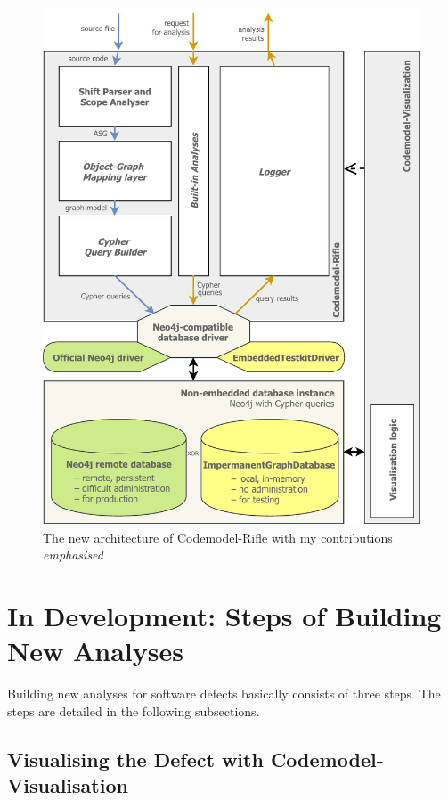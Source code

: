 \begin{figure}[!htb]
	\centering
	\includegraphics[height=\textheight-37mm,clip]{figures/codemodel-rifle-refactored-architecture.pdf}
	\caption{The new architecture of Codemodel-Rifle with my contributions \emph{emphasised}}
	\label{fig:codemodel-rifle-refactored-architecture}
\end{figure}


\newpage
\section{In Development: Steps of Building New Analyses}
\label{section:steps-of-building-new-analyses}

Building new analyses for software defects basically consists of three steps. The steps are detailed in the following subsections.


\subsection{Visualising the Defect with Codemodel-Visualisation}

